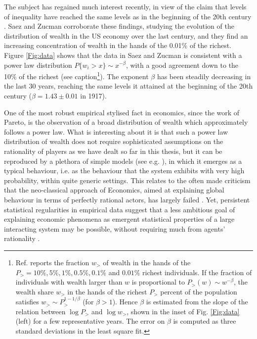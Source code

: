 The subject has regained much interest recently, in view of the claim that levels of inequality have reached the same levels as in the beginning of the 20th century \cite{Piketty2001}. Saez and Zucman \cite{SaezZucman2016} corroborate these findings, studying the evolution of the distribution of wealth in the US economy over the last century, and they find an increasing concentration of wealth in the hands of the 0.01\% of the richest. Figure \ref{Fig:data} shows that the data in Saez and Zucman \cite{SaezZucman2016} is consistent with a power law distribution $P\{w_i>x\}\sim x^{-\beta}$, with a good agreement down to the 10\% of the richest (see caption\footnote{\label{foot:beta fit}
Ref. \cite{SaezZucman2016} reports the fraction $w_>$ of wealth in the hands of the $P_>=10\%, 5\%, 1\%, 0.5\%, 0.1\%$ and $0.01\%$ richest individuals.  If the fraction of individuals with wealth larger than $w$ is proportional to $P_>(w)\sim w^{-\beta}$, the wealth share $w_>$ in the hands of the richest $P_>$ percent of the population satisfies $w_>\sim P_>^{1-1/\beta}$ (for $\beta>1$). Hence $\beta$ is estimated from the slope of the relation between $\log P_>$ and $\log w_>$, shown in the inset of Fig. \ref{Fig:data} (left) for a few representative years. The error on $\beta$ is computed as three standard deviations in the least square fit. 
}). The exponent $\beta$ has been steadily decreasing in the last 30 years,  
reaching the same levels it attained at the beginning of the 20th century ($\beta=1.43\pm 0.01$ in 1917).


One of the most robust empirical stylised fact in economics, since the work of Pareto, is the observation of a broad distribution of wealth which approximately follows a power law.  What is interesting about it is that such a power law distribution of wealth does not require sophisticated assumptions on the rationality of players as we have dealt so far in this thesis, but it can be reproduced by a plethora of simple models (see e.g. \cite{bouchaud2000wealth,Yakovenko2009Review,Gabaix2009,Sornette2013}), in which it emerges as a typical behaviour, i.e. as the behaviour that the system exhibits with very high probability, within quite generic settings. This relates to the often made criticism that the neo-classical approach of Economics, aimed at explaining global behaviour in terms of perfectly rational actors, has largely failed \cite{SMD30,BouchaudCrisis,KirmanBook}. Yet, persistent statistical regularities in empirical data suggest that a less ambitious goal of explaining economic phenomena as emergent statistical properties of a large interacting system may be possible, without requiring much from agents' rationality \cite{Gode1993,Smith2003}. 

